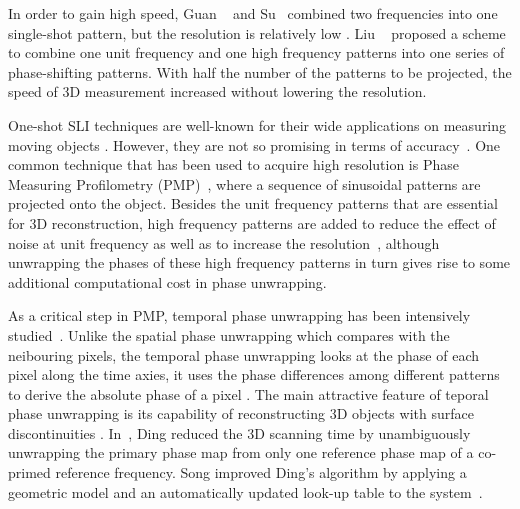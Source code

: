 \documentclass[10pt,letterpaper]{article}
\begin{document}
In order to gain high speed, Guan {\etal}~\cite{guan03} and Su~\cite{suwh06} {\etal} combined two frequencies into one single-shot pattern, but the resolution is relatively low \cite{zhang06}. Liu {\etal}~\cite{liuk10} proposed a scheme to combine one unit frequency and one high frequency patterns into one series of phase-shifting patterns. With half the number of the patterns to be projected, the speed of 3D measurement increased without lowering the resolution.

One-shot SLI techniques are well-known for their wide applications on measuring moving objects \cite{deet17}. However, they are not so promising in terms of accuracy~\cite{zhan12}. One common technique that has been used to acquire high resolution is Phase Measuring Profilometry (PMP)~\cite{srin85}, where a sequence of sinusoidal patterns are projected onto the object.  Besides the unit frequency patterns that are essential for 3D reconstruction, high frequency patterns are added to reduce the effect of noise at unit frequency as well as to increase the resolution~\cite{lijl03}, although unwrapping the phases of these high frequency patterns in turn gives rise to some additional computational cost in phase unwrapping. 

As a critical step in PMP, temporal phase unwrapping has been intensively studied~\cite{zuoc16}. Unlike the spatial phase unwrapping which compares with the neibouring pixels, the temporal phase unwrapping looks at the phase of each pixel along the time axies, it uses the phase differences among different patterns to derive the absolute phase of a pixel \cite{liuy12}. The main attractive feature of teporal phase unwrapping is its capability of reconstructing 3D objects with surface discontinuities \cite{hunt93}.  In~\cite{ding11}, Ding {\etal} reduced the 3D scanning time by unambiguously unwrapping the primary phase map from only one reference phase map of a co-primed reference frequency. Song {\etal} improved Ding's algorithm by applying a geometric model and an automatically updated look-up table to the system~\cite{song18}. 

\end{document}
